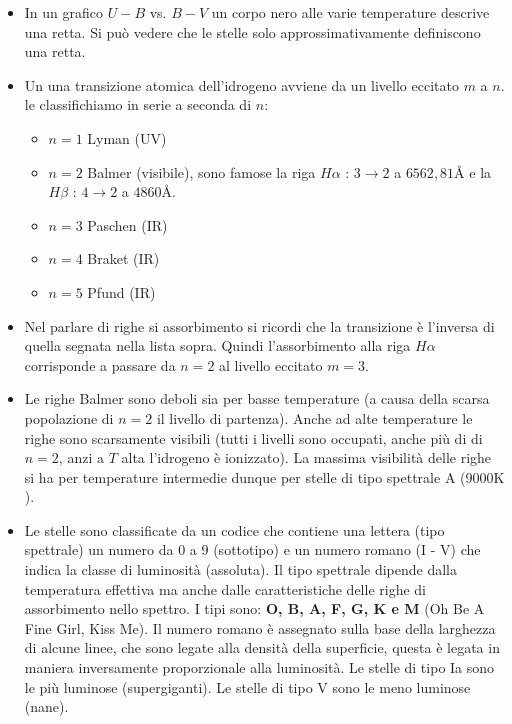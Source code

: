 \documentclass[11pt,a4paper]{article}
\begin{document}
\begin{itemize}
\item In un grafico $U-B$ vs. $B-V$ un corpo nero alle varie temperature descrive una retta. Si può vedere che le stelle solo approssimativamente definiscono una retta.

\item Un una transizione atomica dell'idrogeno avviene da un livello eccitato $m$ a $n$. le classifichiamo in serie a seconda di $n$:
\begin{itemize}
\item $n = 1$ Lyman (UV)
\item $n = 2$ Balmer (visibile), sono famose la riga $H \alpha$ : $3 \rightarrow 2$ a $6562,81 \si{\angstrom}$ e la $H \beta$ : $4 \rightarrow 2$ a $4860 \si{\angstrom}$.
\item $n = 3$ Paschen (IR)
\item $n = 4$ Braket (IR)
\item $n = 5$ Pfund (IR)
\end{itemize}

\item Nel parlare di righe si assorbimento si ricordi che la transizione è l'inversa di quella segnata nella lista sopra. Quindi l'assorbimento alla riga $H \alpha$ corrisponde a passare da $n=2$ al livello eccitato $m = 3$.

\item Le righe Balmer sono deboli sia per basse temperature (a causa della scarsa popolazione di $n=2$ il livello di partenza). Anche ad alte temperature le righe sono scarsamente visibili (tutti i livelli sono occupati, anche più di di $n=2$, anzi a $T$ alta l'idrogeno è ionizzato). La massima visibilità delle righe si ha per temperature intermedie dunque per stelle di tipo spettrale A ($9000\si{\K}$).

\item Le stelle sono classificate da un codice che contiene una lettera (tipo spettrale) un numero da 0 a 9 (sottotipo) e un numero romano (I - V) che indica la classe di luminosità (assoluta). Il tipo spettrale dipende dalla temperatura effettiva ma anche dalle caratteristiche delle righe di assorbimento nello spettro. I tipi sono: \textbf{O, B, A, F, G, K e M} (Oh Be A Fine Girl, Kiss Me).
Il numero romano è assegnato sulla base della larghezza di alcune linee, che sono legate alla densità della superficie, questa è legata in maniera inversamente proporzionale alla luminosità. Le stelle di tipo Ia sono le più luminose (supergiganti). Le stelle di tipo V sono le meno luminose (nane).


\end{itemize}
\end{document}

